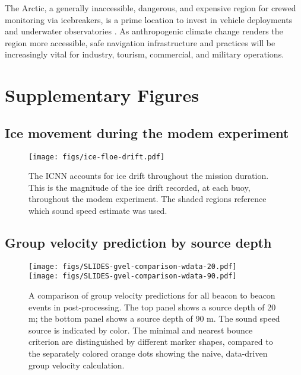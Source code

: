 The Arctic, a generally inaccessible, dangerous, and expensive region for crewed monitoring via icebreakers,  is a prime location to invest in vehicle deployments and underwater observatories \citep{mikhalevsky_multipurpose_2015}.
As anthropogenic climate change renders the region more accessible, safe navigation infrastructure and practices will be increasingly vital for industry, tourism, commercial, and military operations.

\clearpage
\section*{Supplementary Figures}

\subsection*{Ice movement during the modem experiment}
\begin{figure}[h!]
\texttt{[image: figs/ice-floe-drift.pdf]}
\caption{\label{fig:iceFloeDrift}{The ICNN accounts for ice drift throughout the mission duration. This is the magnitude of the ice drift recorded, at each buoy, throughout the modem experiment. The shaded regions reference which sound speed estimate was used.}}
\end{figure}

\clearpage
\FloatBarrier
\subsection*{Group velocity prediction by source depth}
\begin{figure}[h!]
\texttt{[image: figs/SLIDES-gvel-comparison-wdata-20.pdf]} \\
\vspace{2em}
\texttt{[image: figs/SLIDES-gvel-comparison-wdata-90.pdf]}
\caption{A comparison of group velocity predictions for all beacon to beacon events in post-processing. The top panel shows a source depth of 20 m; the bottom panel shows a source depth of 90 m. The sound speed source is indicated by color. The minimal and nearest bounce criterion are distinguished by different marker shapes, compared to the separately colored orange dots showing the naive, data-driven group velocity calculation.}
\label{fig:gvelMore}
\end{figure}



